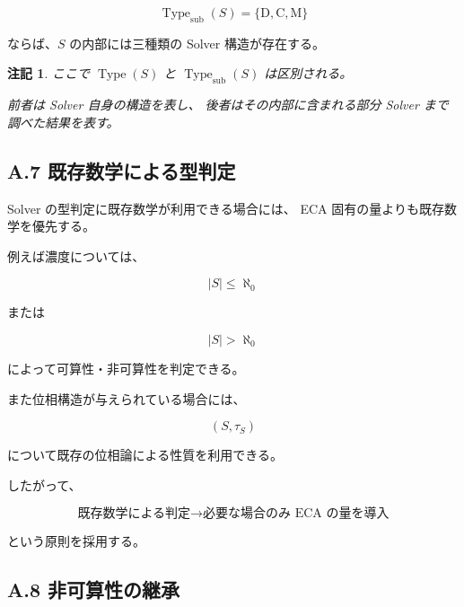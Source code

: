 \documentclass[a4paper,11pt]{article}
\newtheorem{remark}[definition]{注記}
\newcommand{\Type}{\operatorname{Type}}
\newcommand{\DType}{\mathrm{D}}
\newcommand{\CType}{\mathrm{C}}
\newcommand{\MType}{\mathrm{M}}
\begin{document}
\begin{equation}
    \Type_{\mathrm{sub}}(S)
    =
    \{\DType,\CType,\MType\}
\end{equation}

ならば、$S$ の内部には三種類の Solver 構造が存在する。

\begin{remark}
ここで $\Type(S)$ と
$\Type_{\mathrm{sub}}(S)$ は区別される。

前者は Solver 自身の構造を表し、
後者はその内部に含まれる部分 Solver まで調べた結果を表す。
\end{remark}


\subsection{A.7 既存数学による型判定}

Solver の型判定に既存数学が利用できる場合には、
ECA 固有の量よりも既存数学を優先する。

例えば濃度については、

\begin{equation}
    |S|\leq\aleph_0
\end{equation}

または

\begin{equation}
    |S|>\aleph_0
\end{equation}

によって可算性・非可算性を判定できる。

また位相構造が与えられている場合には、

\begin{equation}
    (S,\tau_S)
\end{equation}

について既存の位相論による性質を利用できる。

したがって、

\begin{equation}
    \boxed{
    \text{既存数学による判定}
    \longrightarrow
    \text{必要な場合のみ ECA の量を導入}
    }
\end{equation}

という原則を採用する。


\subsection{A.8 非可算性の継承}
\end{document}
